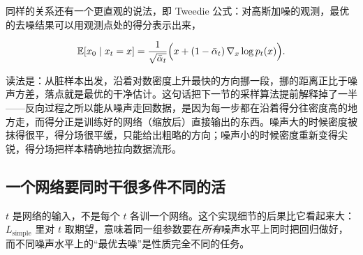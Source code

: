 同样的关系还有一个更直观的说法，即 Tweedie 公式：对高斯加噪的观测，最优的去噪结果可以用观测点处的得分表示出来，

\[
\mathbb{E}[x_0\mid x_t=x]=\frac{1}{\sqrt{\bar\alpha_t}}\Bigl(x+(1-\bar\alpha_t)\,\nabla_x\log p_t(x)\Bigr).
\]

读法是：从脏样本出发，沿着对数密度上升最快的方向挪一段，挪的距离正比于噪声方差，落点就是最优的干净估计。这句话把下一节的采样算法提前解释掉了一半——反向过程之所以能从噪声走回数据，是因为每一步都在沿着得分往密度高的地方走，而得分正是训练好的网络（缩放后）直接输出的东西。噪声大的时候密度被抹得很平，得分场很平缓，只能给出粗略的方向；噪声小的时候密度重新变得尖锐，得分场把样本精确地拉向数据流形。

\subsection{一个网络要同时干很多件不同的活}

\(t\) 是网络的输入，不是每个 \(t\) 各训一个网络。这个实现细节的后果比它看起来大：\(L_{\mathrm{simple}}\) 里对 \(t\) 取期望，意味着同一组参数要在\emph{所有}噪声水平上同时把回归做好，而不同噪声水平上的``最优去噪''是性质完全不同的任务。

